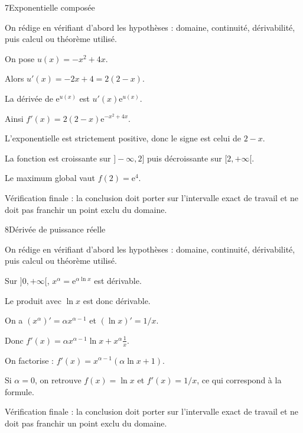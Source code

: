 \documentclass[11pt,a4paper]{article}
\newcommand{\e}{\mathrm{e}}
\begin{document}
\begin{corrbox}{7}{Exponentielle composée}

\begin{methodebox}
On rédige en vérifiant d'abord les hypothèses : domaine, continuité, dérivabilité, puis calcul ou théorème utilisé.
\end{methodebox}

On pose $u(x)=-x^2+4x$.


Alors $u'(x)=-2x+4=2(2-x)$.


La dérivée de $\e^{u(x)}$ est $u'(x)\e^{u(x)}$.


Ainsi $f'(x)=2(2-x)\e^{-x^2+4x}$.


L'exponentielle est strictement positive, donc le signe est celui de $2-x$.


La fonction est croissante sur $]-\infty,2]$ puis décroissante sur $[2,+\infty[$.


Le maximum global vaut $f(2)=\e^4$.


\begin{attentionbox}
Vérification finale : la conclusion doit porter sur l'intervalle exact de travail et ne doit pas franchir un point exclu du domaine.
\end{attentionbox}

\end{corrbox}


\begin{corrbox}{8}{Dérivée de puissance réelle}

\begin{methodebox}
On rédige en vérifiant d'abord les hypothèses : domaine, continuité, dérivabilité, puis calcul ou théorème utilisé.
\end{methodebox}

Sur $]0,+\infty[$, $x^\alpha=\e^{\alpha\ln x}$ est dérivable.


Le produit avec $\ln x$ est donc dérivable.


On a $(x^\alpha)'=\alpha x^{\alpha-1}$ et $(\ln x)'=1/x$.


Donc $f'(x)=\alpha x^{\alpha-1}\ln x+x^\alpha\frac1x$.


On factorise : $f'(x)=x^{\alpha-1}(\alpha\ln x+1)$.


Si $\alpha=0$, on retrouve $f(x)=\ln x$ et $f'(x)=1/x$, ce qui correspond à la formule.


\begin{attentionbox}
Vérification finale : la conclusion doit porter sur l'intervalle exact de travail et ne doit pas franchir un point exclu du domaine.
\end{attentionbox}

\end{corrbox}
\end{document}
